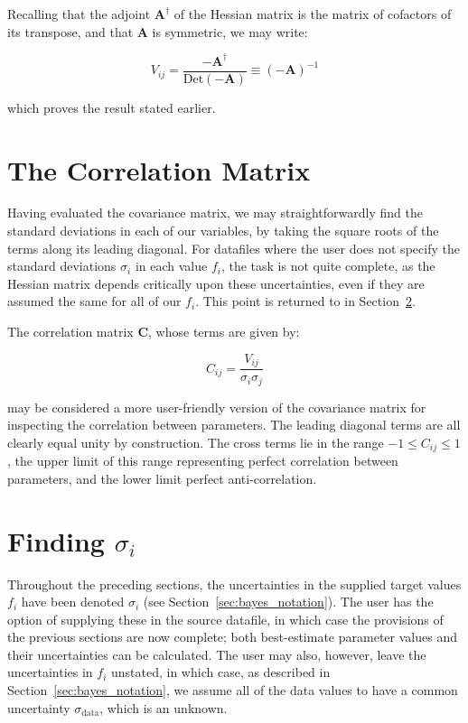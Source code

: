 Recalling that the adjoint $\mathbf{A}^\dagger$ of the Hessian matrix is the
matrix of cofactors of its transpose, and that $\mathbf{A}$ is symmetric, we
may write:

\begin{equation}
V_{ij} = \frac{-\mathbf{A}^\dagger}{\mathrm{Det}(\mathbf{-A})} \equiv (-\mathbf{A})^{-1}
\end{equation}

\noindent which proves the result stated earlier.

\section{The Correlation Matrix}
\label{sec:correlation_matrix}

Having evaluated the covariance matrix, we may straightforwardly find the
standard deviations in each of our variables, by taking the square roots of the
terms along its leading diagonal. For datafiles where the user does not specify
the standard deviations $\sigma_i$ in each value $f_i$, the task is not quite
complete, as the Hessian matrix depends critically upon these uncertainties,
even if they are assumed the same for all of our $f_i$. This point is returned
to in Section~\ref{sec:finding_sigmai}.

The correlation matrix $\mathbf{C}$, whose terms are given by:

\begin{equation}
C_{ij} = \frac{V_{ij}}{\sigma_i\sigma_j}
\end{equation}

\noindent may be considered a more user-friendly version of the covariance
matrix for inspecting the correlation between parameters. The leading diagonal
terms are all clearly equal unity by construction. The cross terms lie in the
range $-1 \leq C_{ij} \leq 1$, the upper limit of this range representing
perfect correlation between parameters, and the lower limit perfect
anti-correlation.

\section{Finding $\sigma_i$}
\label{sec:finding_sigmai}

Throughout the preceding sections, the uncertainties in the supplied target
values $f_i$ have been denoted $\sigma_i$ (see
Section~\ref{sec:bayes_notation}).  The user has the option of supplying these
in the source datafile, in which case the provisions of the previous sections
are now complete; both best-estimate parameter values and their uncertainties
can be calculated. The user may also, however, leave the uncertainties in $f_i$
unstated, in which case, as described in Section~\ref{sec:bayes_notation}, we
assume all of the data values to have a common uncertainty
$\sigma_\mathrm{data}$, which is an unknown.

